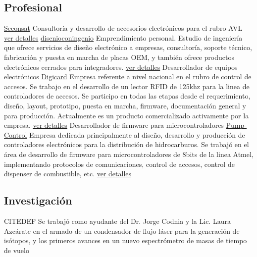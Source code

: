 \documentclass[11pt,a4paper,sans]{moderncv} 	%
\begin{document}
\subsection{Profesional}
	 	{\href{www.seconsat.com} 		{Seconsat}} 		{}{}{Consultoría y desarrollo de accesorios electrónicos para el rubro AVL \href{http://disenioconingenio.com.ar/producto.php?products_id=392}{ver detalles}}
	 			{\href{www.disenioconingenio.com.ar} 	{disenioconingenio}} 	{}{}{Emprendimiento personal. Estudio de ingeniería que ofrece servicios de diseño electrónico a empresas, consultoría, soporte técnico, fabricación y puesta en marcha de placas OEM, y también ofrece productos electrónicos cerrados para integradores. \href{http://disenioconingenio.com.ar/producto.php?products_id=398}{ver detalles}}
	 	{Desarrollador de equipos electrónicos} 		{\href{www.digicard.com.ar} 		{Digicard}} 		{}{}{Empresa referente a nivel nacional en el rubro de control de accesos. Se trabajo en el desarrollo de un lector RFID de 125khz para la linea de controladores de accesos. Se participo en todas las etapas desde el requerimiento, diseño, layout, prototipo, puesta en marcha, firmware, documentación general y para producción. Actualmente es un producto comercializado activamente por la empresa. \href{http://disenioconingenio.com.ar/producto.php?products_id=393}{ver detalles}}
	 	{Desarrollador de firmware para microcontroladores} 	{\href{www.pump-control.com.ar} 	{Pump-Control}} 	{}{}{Empresa dedicada principalmente al diseño, desarrollo y producción de controladores electrónicos para la distribución de hidrocarburos. Se trabajó en el área de desarrollo de firmware para microcontroladores de 8bits de la linea Atmel, implementando protocolos de comunicaciones, control de accesos, control de dispenser de combustible, etc. \href{http://disenioconingenio.com.ar/producto.php?products_id=391}{ver detalles}}

	\subsection{Investigación}
	 	{CITEDEF} 	{}{}{Se trabajó como ayudante del Dr. Jorge Codnia y la Lic. Laura Azcárate en el armado de un condensador de flujo láser para la generación de isótopos, y los primeros avances en un nuevo espectrómetro de masas de tiempo de vuelo}
\end{document}
